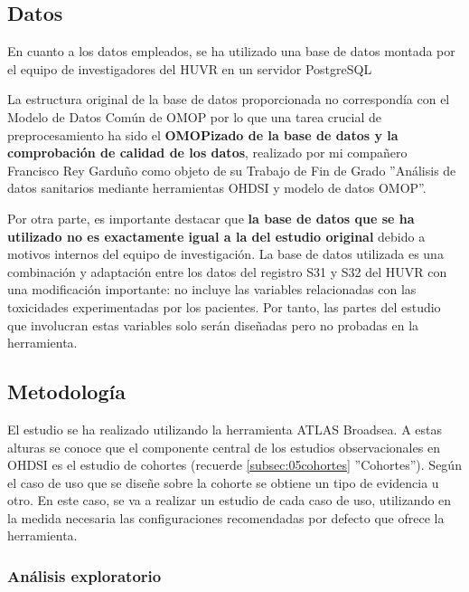 \subsection{Datos}

En cuanto a los datos empleados, se ha utilizado una base de datos montada por el equipo de investigadores del HUVR en un servidor PostgreSQL

La estructura original de la base de datos proporcionada no correspondía con el Modelo de Datos Común de OMOP por lo que una tarea crucial de preprocesamiento ha sido el \textbf{OMOPizado de la base de datos y la comprobación de calidad de los datos}, realizado por mi compañero Francisco Rey Garduño como objeto de su Trabajo de Fin de Grado ''Análisis de datos sanitarios mediante herramientas OHDSI y modelo de datos OMOP''.

Por otra parte, es importante destacar que \textbf{la base de datos que se ha utilizado no es exactamente igual a la del estudio original} debido a motivos internos del equipo de investigación. La base de datos utilizada es una combinación y adaptación entre los datos del registro S31 y S32 del HUVR con una modificación importante: no incluye las variables relacionadas con las toxicidades experimentadas por los pacientes. Por tanto, las partes del estudio que involucran estas variables solo serán diseñadas pero no probadas en la herramienta.

\subsection{Metodología}

El estudio se ha realizado utilizando la herramienta ATLAS Broadsea. A estas alturas se conoce que el componente central de los estudios observacionales en OHDSI es el estudio de cohortes (recuerde \ref{subsec:05cohortes} ''Cohortes''). Según el caso de uso que se diseñe sobre la cohorte se obtiene un tipo de evidencia u otro. En este caso, se va a realizar un estudio de cada caso de uso, utilizando en la medida necesaria las configuraciones recomendadas por defecto que ofrece la herramienta.

\subsubsection{Análisis exploratorio}

